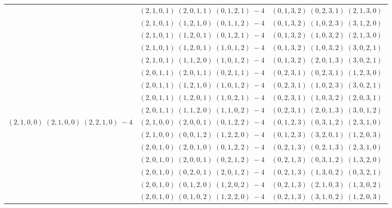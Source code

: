 \documentclass[11pt]{article}
\begin{document}
\begin{longtable}[l]{|c|c|c|}
 \cline{2-3} 
 & $(2 ,1 ,0 ,1) \;(2 ,0 ,1 ,1) \;(0 ,1 ,2 ,1) \;-4$ & $(0 ,1 ,3 ,2) \;(0 ,2 ,3 ,1) \;(2 ,1 ,3 ,0) \;$\\ 
 \cline{2-3} 
 & $(2 ,1 ,0 ,1) \;(1 ,2 ,1 ,0) \;(0 ,1 ,1 ,2) \;-4$ & $(0 ,1 ,3 ,2) \;(1 ,0 ,2 ,3) \;(3 ,1 ,2 ,0) \;$\\ 
 \cline{2-3} 
 & $(2 ,1 ,0 ,1) \;(1 ,2 ,0 ,1) \;(0 ,1 ,2 ,1) \;-4$ & $(0 ,1 ,3 ,2) \;(1 ,0 ,3 ,2) \;(2 ,1 ,3 ,0) \;$\\ 
 \cline{2-3} 
 & $(2 ,1 ,0 ,1) \;(1 ,2 ,0 ,1) \;(1 ,0 ,1 ,2) \;-4$ & $(0 ,1 ,3 ,2) \;(1 ,0 ,3 ,2) \;(3 ,0 ,2 ,1) \;$\\ 
 \cline{2-3} 
 & $(2 ,1 ,0 ,1) \;(1 ,1 ,2 ,0) \;(1 ,0 ,1 ,2) \;-4$ & $(0 ,1 ,3 ,2) \;(2 ,0 ,1 ,3) \;(3 ,0 ,2 ,1) \;$\\ 
 \cline{2-3} 
 & $(2 ,0 ,1 ,1) \;(2 ,0 ,1 ,1) \;(0 ,2 ,1 ,1) \;-4$ & $(0 ,2 ,3 ,1) \;(0 ,2 ,3 ,1) \;(1 ,2 ,3 ,0) \;$\\ 
 \cline{2-3} 
 & $(2 ,0 ,1 ,1) \;(1 ,2 ,1 ,0) \;(1 ,0 ,1 ,2) \;-4$ & $(0 ,2 ,3 ,1) \;(1 ,0 ,2 ,3) \;(3 ,0 ,2 ,1) \;$\\ 
 \cline{2-3} 
 & $(2 ,0 ,1 ,1) \;(1 ,2 ,0 ,1) \;(1 ,0 ,2 ,1) \;-4$ & $(0 ,2 ,3 ,1) \;(1 ,0 ,3 ,2) \;(2 ,0 ,3 ,1) \;$\\ 
 \cline{2-3} 
 & $(2 ,0 ,1 ,1) \;(1 ,1 ,2 ,0) \;(1 ,1 ,0 ,2) \;-4$ & $(0 ,2 ,3 ,1) \;(2 ,0 ,1 ,3) \;(3 ,0 ,1 ,2) \;$\\ \hline\multirow[t]{18}{*}{ $(2 ,1 ,0 ,0) \;(2 ,1 ,0 ,0) \;(2 ,2 ,1 ,0) \;-4$ }  & $(2 ,1 ,0 ,0) \;(2 ,0 ,0 ,1) \;(0 ,1 ,2 ,2) \;-4$ & $(0 ,1 ,2 ,3) \;(0 ,3 ,1 ,2) \;(2 ,3 ,1 ,0) \;$\\ 
 \cline{2-3} 
 & $(2 ,1 ,0 ,0) \;(0 ,0 ,1 ,2) \;(1 ,2 ,2 ,0) \;-4$ & $(0 ,1 ,2 ,3) \;(3 ,2 ,0 ,1) \;(1 ,2 ,0 ,3) \;$\\ 
 \cline{2-3} 
 & $(2 ,0 ,1 ,0) \;(2 ,0 ,1 ,0) \;(0 ,1 ,2 ,2) \;-4$ & $(0 ,2 ,1 ,3) \;(0 ,2 ,1 ,3) \;(2 ,3 ,1 ,0) \;$\\ 
 \cline{2-3} 
 & $(2 ,0 ,1 ,0) \;(2 ,0 ,0 ,1) \;(0 ,2 ,1 ,2) \;-4$ & $(0 ,2 ,1 ,3) \;(0 ,3 ,1 ,2) \;(1 ,3 ,2 ,0) \;$\\ 
 \cline{2-3} 
 & $(2 ,0 ,1 ,0) \;(0 ,2 ,0 ,1) \;(2 ,0 ,1 ,2) \;-4$ & $(0 ,2 ,1 ,3) \;(1 ,3 ,0 ,2) \;(0 ,3 ,2 ,1) \;$\\ 
 \cline{2-3} 
 & $(2 ,0 ,1 ,0) \;(0 ,1 ,2 ,0) \;(1 ,2 ,0 ,2) \;-4$ & $(0 ,2 ,1 ,3) \;(2 ,1 ,0 ,3) \;(1 ,3 ,0 ,2) \;$\\ 
 \cline{2-3} 
 & $(2 ,0 ,1 ,0) \;(0 ,1 ,0 ,2) \;(1 ,2 ,2 ,0) \;-4$ & $(0 ,2 ,1 ,3) \;(3 ,1 ,0 ,2) \;(1 ,2 ,0 ,3) \;$\\ 

\end{longtable}
\end{document}
